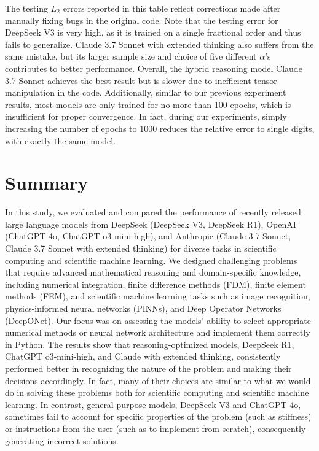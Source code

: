 \documentclass{article}
\begin{document}
The testing $L_2$ errors reported in this table reflect corrections made after manually fixing bugs in the original code. Note that the testing error for DeepSeek V3 is very high, as it is trained on a single fractional order and thus fails to generalize. Claude 3.7 Sonnet with extended thinking also suffers from the same mistake, but its larger sample size and choice of five different $\alpha$'s contributes to better performance.  Overall, the hybrid reasoning model Claude 3.7 Sonnet achieves the best result but is slower due to inefficient tensor manipulation in the code. Additionally, similar to our previous experiment results, most models are only trained for no more than 100 epochs, which is insufficient for proper convergence. In fact, during our experiments, simply increasing the number of epochs to 1000 reduces the relative error to single digits, with exactly the same model. 



\section{Summary}
In this study, we evaluated and compared the performance of recently released large language models from DeepSeek (DeepSeek V3, DeepSeek R1), OpenAI (ChatGPT 4o, ChatGPT o3-mini-high), and Anthropic (Claude 3.7 Sonnet, Claude 3.7 Sonnet with extended thinking) for diverse tasks in scientific computing and scientific machine learning. We designed challenging problems that require advanced mathematical reasoning and domain-specific knowledge, including numerical integration, finite difference methods (FDM), finite element methods (FEM), and scientific machine learning tasks such as image recognition, physics-informed neural networks (PINNs), and Deep Operator Networks (DeepONet). Our focus was on assessing the models’ ability to select appropriate numerical methods or neural network architecture and implement them correctly in Python. The results show that reasoning-optimized models, DeepSeek R1, ChatGPT o3-mini-high, and Claude with extended thinking, consistently performed better in recognizing the nature of the problem and making their decisions accordingly. In fact, many of their choices are similar to what we would do in solving these problems both for scientific computing and scientific  machine learning. In contrast, general-purpose models, DeepSeek V3 and ChatGPT 4o, sometimes fail to account for specific properties of the problem (such as stiffness) or instructions from the user (such as to implement from scratch), consequently generating incorrect solutions.
\end{document}
